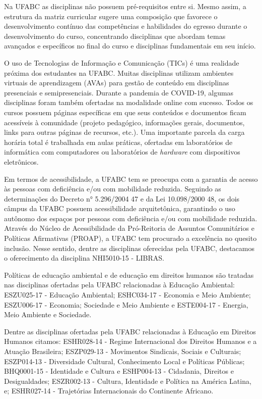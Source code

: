 Na UFABC as disciplinas não possuem pré-requisitos entre si.
Mesmo assim, a estrutura da matriz curricular sugere uma composição que
favorece o desenvolvimento contínuo das competências e habilidades do egresso
durante o desenvolvimento do curso, concentrando disciplinas que abordam temas
avançados e específicos no final do curso e disciplinas fundamentais em seu
início.

O uso de Tecnologias de Informação e Comunicação (TICs) é uma realidade próxima
dos estudantes na UFABC.
Muitas disciplinas utilizam ambientes virtuais de aprendizagem (AVAs) para
gestão de conteúdo em disciplinas presenciais e semipresenciais.
Durante a pandemia de COVID-19, algumas disciplinas foram também ofertadas na
modalidade online com sucesso.
Todos os cursos possuem páginas específicas em que seus conteúdos e documentos
ficam acessíveis à comunidade (projeto pedagógico, informações gerais,
documentos, links para outras páginas de recursos, etc.).
Uma importante parcela da carga horária total é trabalhada em aulas práticas,
ofertadas em laboratórios de informática com computadores ou laboratórios de
{\it hardware} com dispositivos eletrônicos.


Em termos de acessibilidade, a UFABC tem se preocupa com a garantia de acesso
às pessoas com deficiência e/ou com mobilidade reduzida. 
Seguindo as determinações do Decreto n° 5.296/2004 47 e da Lei 10.098/2000 48,
os dois câmpus da UFABC possuem acessibilidade arquitetônica, garantindo o uso
autônomo dos espaços por pessoas com deficiência e/ou com mobilidade reduzida.
Através do Núcleo de Acessibilidade da Pró-Reitoria de Assuntos Comunitários e
Políticas Afirmativas (PROAP), a UFABC tem procurado a excelência no quesito
inclusão.
Nesse sentido, dentre as disciplinas oferecidas pela UFABC, destacamos o
oferecimento da disciplina NHI5010-15 - LIBRAS.

Políticas de educação ambiental e de educação em direitos humanos são tratadas
nas disciplinas ofertadas pela UFABC relacionadas à Educação Ambiental: 
ESZU025-17 - Educação Ambiental; ESHC034-17 - Economia e Meio Ambiente;
ESZU006-17 - Economia; Sociedade e Meio Ambiente e ESTE004-17 - Energia, Meio
Ambiente e Sociedade.

Dentre as disciplinas ofertadas pela UFABC relacionadas à Educação em Direitos
Humanos citamos: ESHR028-14 - Regime Internacional dos Direitos Humanos e a
Atuação Brasileira; ESZP029-13 - Movimentos Sindicais, Sociais e Culturais;
ESZP014-13 - Diversidade Cultural, Conhecimento Local e Políticas Públicas;
BHQ0001-15 - Identidade e Cultura e ESHP004-13 - Cidadania, Direitos e
Desigualdades; ESZR002-13 - Cultura, Identidade e Política na América Latina,
e; ESHR027-14 - Trajetórias Internacionais do Continente Africano.




